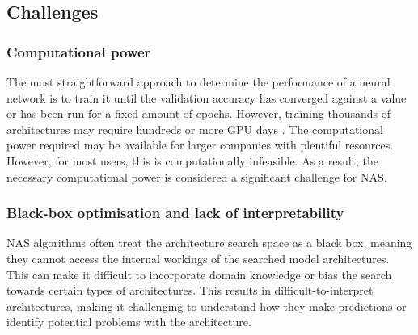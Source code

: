 \subsection{Challenges}
\subsubsection{Computational power}
The most straightforward approach to determine the performance of a neural network is to train it until the validation accuracy has converged against a value or has been run for a fixed amount of epochs. However, training thousands of architectures may require hundreds or more \gls{GPU} days \autocite{ren2021comprehensive}. The computational power required may be available for larger companies with plentiful resources. However, for most users, this is computationally infeasible. As a result, the necessary computational power is considered a significant challenge for \gls{NAS}. 

\subsubsection{Black-box optimisation and lack of interpretability}
\gls{NAS} algorithms often treat the architecture search space as a black box, meaning they cannot access the internal workings of the searched model architectures. This can make it difficult to incorporate domain knowledge or bias the search towards certain types of architectures. This results in difficult-to-interpret architectures, making it challenging to understand how they make predictions or identify potential problems with the architecture. \autocite{https://doi.org/10.48550/arxiv.1806.09055}
